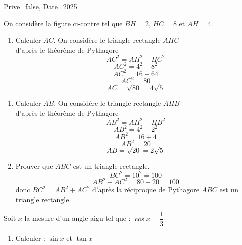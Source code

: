 \documentclass[a4paper,12pt]{article}
\begin{document}
\begin{Maquette}[Exam]{Prive=false, Date=2025}
\begin{exercice}[BaremeDetaille]
On considère la figure ci-contre tel que $BH=2$, $HC=8$ et $AH=4$.
\vspace*{3mm}

\begin{minipage}{.7\linewidth}
\begin{enumerate}
\item{} Calculer $AC$.\newline
On considère le triangle rectangle $AHC$\\
d'après le théorème de Pythagore\\
$$AC^{2}=AH^{2}+HC^{2}$$
$$AC^{2}=4^{2}+8^{2}$$
$$AC^{2}=16+64$$
$$AC^{2}=80$$
$$AC=\sqrt{80}=4\sqrt{5}$$
\end{enumerate}
\end{minipage}%
\begin{minipage}{.3\linewidth}
\end{minipage}%
\begin{enumerate}[start=2]
\item{} Calculer $AB$.
On considère le triangle rectangle $AHB$\\
d'après le théorème de Pythagore\\
$$AB^{2}=AH^{2}+HB^{2}$$
$$AB^{2}=4^{2}+2^{2}$$
$$AB^{2}=16+4$$
$$AB^{2}=20$$
$$AB=\sqrt{20}=2\sqrt{5}$$
\item{} Prouver que $ABC$ est un triangle rectangle.
$$BC^{2}=10^{2}=100$$
$$AB^{2}+AC^{2}=80+20=100$$
donc $BC^{2}=AB^{2}+AC^{2}$ d'après la réciproque de Pythagore $ABC$ est un triangle rectangle.
\end{enumerate}
\end{exercice}

\begin{exercice}[BaremeDetaille]
Soit $x$ la mesure d'un angle aigu tel que : $\cos x =\dfrac{1}{3}$
\begin{enumerate}
\item{} Calculer : $\sin x$ et $\tan x$\vspace{5mm}


\end{enumerate}
\end{exercice}
\end{Maquette}
\end{document}
